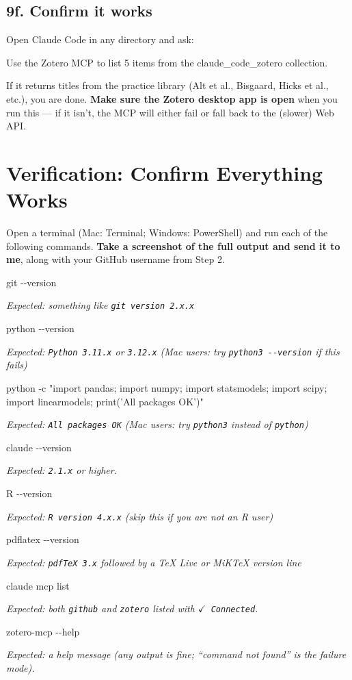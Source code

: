\documentclass[11pt]{article}
\newcommand{\cmd}[1]{\par\vspace{0.2em}\colorbox{codegray}{\parbox{\dimexpr\linewidth-2\fboxsep}{\ttfamily\small #1}}\par\vspace{0.2em}}
\begin{document}
\subsection*{9f. Confirm it works}

Open Claude Code in any directory and ask:
\cmd{Use the Zotero MCP to list 5 items from the claude\_code\_zotero collection.}

If it returns titles from the practice library (Alt et al., Bisgaard, Hicks et al., etc.), you are done. \textbf{Make sure the Zotero desktop app is open} when you run this --- if it isn't, the MCP will either fail or fall back to the (slower) Web API.

\section*{Verification: Confirm Everything Works}
Open a terminal (Mac: Terminal; Windows: PowerShell) and run each of the following commands. \textbf{Take a screenshot of the full output and send it to me}, along with your GitHub username from Step 2.

\cmd{git -\/-version}
\textit{Expected: something like \texttt{git version 2.x.x}}

\cmd{python -\/-version}
\textit{Expected: \texttt{Python 3.11.x} or \texttt{3.12.x} (Mac users: try \texttt{python3 -\/-version} if this fails)}

\cmd{python -c "import pandas; import numpy; import statsmodels; import scipy; import linearmodels; print('All packages OK')"}
\textit{Expected: \texttt{All packages OK} (Mac users: try \texttt{python3} instead of \texttt{python})}

\cmd{claude -\/-version}
\textit{Expected: \texttt{2.1.x} or higher.}

\cmd{R -\/-version}
\textit{Expected: \texttt{R version 4.x.x} (skip this if you are not an R user)}

\cmd{pdflatex -\/-version}
\textit{Expected: \texttt{pdfTeX 3.x} followed by a TeX Live or MiKTeX version line}

\cmd{claude mcp list}
\textit{Expected: both \texttt{github} and \texttt{zotero} listed with \texttt{$\checkmark$ Connected}.}

\cmd{zotero-mcp -\/-help}
\textit{Expected: a help message (any output is fine; ``command not found'' is the failure mode).}
\end{document}
